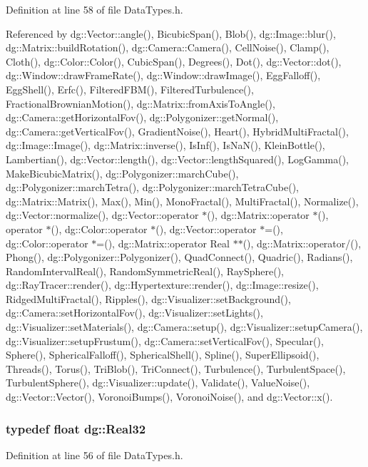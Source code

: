 Definition at line 58 of file Data\-Types.h.

Referenced by dg::Vector::angle(), Bicubic\-Span(), Blob(), dg::Image::blur(), dg::Matrix::build\-Rotation(), dg::Camera::Camera(), Cell\-Noise(), Clamp(), Cloth(), dg::Color::Color(), Cubic\-Span(), Degrees(), Dot(), dg::Vector::dot(), dg::Window::draw\-Frame\-Rate(), dg::Window::draw\-Image(), Egg\-Falloff(), Egg\-Shell(), Erfc(), Filtered\-FBM(), Filtered\-Turbulence(), Fractional\-Brownian\-Motion(), dg::Matrix::from\-Axis\-To\-Angle(), dg::Camera::get\-Horizontal\-Fov(), dg::Polygonizer::get\-Normal(), dg::Camera::get\-Vertical\-Fov(), Gradient\-Noise(), Heart(), Hybrid\-Multi\-Fractal(), dg::Image::Image(), dg::Matrix::inverse(), Is\-Inf(), Is\-Na\-N(), Klein\-Bottle(), Lambertian(), dg::Vector::length(), dg::Vector::length\-Squared(), Log\-Gamma(), Make\-Bicubic\-Matrix(), dg::Polygonizer::march\-Cube(), dg::Polygonizer::march\-Tetra(), dg::Polygonizer::march\-Tetra\-Cube(), dg::Matrix::Matrix(), Max(), Min(), Mono\-Fractal(), Multi\-Fractal(), Normalize(), dg::Vector::normalize(), dg::Vector::operator $\ast$(), dg::Matrix::operator $\ast$(), operator $\ast$(), dg::Color::operator $\ast$(), dg::Vector::operator $\ast$=(), dg::Color::operator $\ast$=(), dg::Matrix::operator Real $\ast$$\ast$(), dg::Matrix::operator/(), Phong(), dg::Polygonizer::Polygonizer(), Quad\-Connect(), Quadric(), Radians(), Random\-Interval\-Real(), Random\-Symmetric\-Real(), Ray\-Sphere(), dg::Ray\-Tracer::render(), dg::Hypertexture::render(), dg::Image::resize(), Ridged\-Multi\-Fractal(), Ripples(), dg::Visualizer::set\-Background(), dg::Camera::set\-Horizontal\-Fov(), dg::Visualizer::set\-Lights(), dg::Visualizer::set\-Materials(), dg::Camera::setup(), dg::Visualizer::setup\-Camera(), dg::Visualizer::setup\-Frustum(), dg::Camera::set\-Vertical\-Fov(), Specular(), Sphere(), Spherical\-Falloff(), Spherical\-Shell(), Spline(), Super\-Ellipsoid(), Threads(), Torus(), Tri\-Blob(), Tri\-Connect(), Turbulence(), Turbulent\-Space(), Turbulent\-Sphere(), dg::Visualizer::update(), Validate(), Value\-Noise(), dg::Vector::Vector(), Voronoi\-Bumps(), Voronoi\-Noise(), and dg::Vector::x().
\subsubsection{\setlength{\rightskip}{0pt plus 5cm}typedef float dg::Real32}\label{namespacedg_a26}




Definition at line 56 of file Data\-Types.h.
